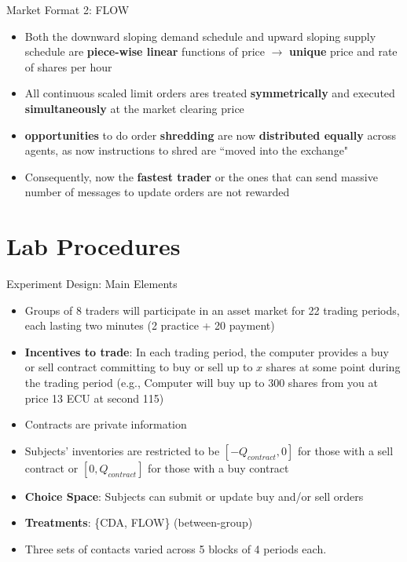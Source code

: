 \documentclass[10pt]{beamer}
\begin{document}
\begin{frame}{Market Format 2: FLOW}
\begin{itemize}
\item Both the downward sloping demand schedule and upward sloping supply schedule are \textbf{piece-wise linear} functions of price $\rightarrow$ \textbf{unique} price and rate of shares per hour
\item All continuous scaled limit orders ares treated \textbf{symmetrically} and executed \textbf{simultaneously} at the market clearing price
        \item \textbf{opportunities} to do order \textbf{shredding} are now \textbf{distributed equally} across agents, as now instructions to shred are ``moved into the exchange"
        \item Consequently, now the
        \textbf{fastest trader} or the ones that can send massive number of messages to update orders are not rewarded
    \end{itemize}
\end{frame}

\section{Lab Procedures}

\begin{frame}{Experiment Design: Main Elements}
    \begin{itemize}
        \item Groups of 8 traders will participate in an asset market for 22 trading periods, each lasting two minutes (2 practice + 20 payment)
        \item \textbf{Incentives to trade}: In each trading period, the computer provides a buy or sell contract committing to buy or sell up to $x$ shares at some point during the trading period (e.g., Computer will buy up to 300 shares from you at price 13 ECU at second 115)
        \item Contracts are private information
        \item Subjects' inventories are restricted to be $[-Q_{contract}, 0]$ for those with a sell contract or $[0, Q_{contract}]$ for those with a buy contract
        \item \textbf{Choice Space}: Subjects can submit or update buy and/or sell orders
        \item \textbf{Treatments}: \{CDA, FLOW\} (between-group)
        \item Three sets of contacts varied across 5 blocks of 4 periods each. 
    \end{itemize}
\end{frame}
\end{document}
